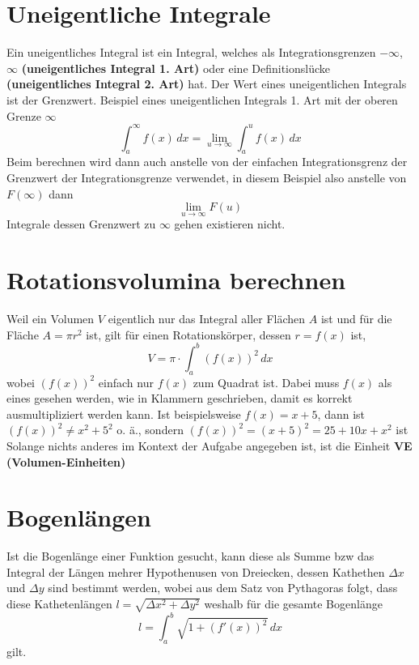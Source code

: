 \documentclass{article}
\begin{document}
\section{Uneigentliche Integrale}
Ein uneigentliches Integral ist ein Integral, welches als Integrationsgrenzen $-\infty$, $\infty$ \textbf{(uneigentliches Integral 1. Art)} oder eine Definitionslücke \textbf{(uneigentliches Integral 2. Art)} hat.
Der Wert eines uneigentlichen Integrals ist der Grenzwert. \newline
Beispiel eines uneigentlichen Integrals 1. Art mit der oberen Grenze $\infty$ 
\[\int_a^\infty f(x)\,dx = \lim_{u \to \infty} \int_a^u f(x)\,dx\] 
Beim berechnen wird dann auch anstelle von der einfachen Integrationsgrenz der Grenzwert der Integrationsgrenze verwendet, in diesem Beispiel also anstelle von $F(\infty)$ dann
\[\lim_{u \to \infty} F(u)\] 
Integrale dessen Grenzwert zu $\infty$ gehen existieren nicht.
 
\section{Rotationsvolumina berechnen}
Weil ein Volumen $V$ eigentlich nur das Integral aller Flächen $A$ ist und für die Fläche $A=\pi r^2$ ist, gilt für einen Rotationskörper, dessen $r=f(x)$ ist,
\[V = \pi \cdot \int_a^b (f(x))^2 \, dx\]
wobei $(f(x))^2$ einfach nur $f(x)$ zum Quadrat ist. Dabei muss $f(x)$ als eines gesehen werden, wie in Klammern geschrieben, damit es korrekt ausmultipliziert werden kann. Ist beispielsweise $f(x)=x+5$, dann ist $(f(x))^2 \neq x^2+5^2$ o. ä., sondern $(f(x))^2=(x+5)^2=25+10x+x^2$ ist \newline
Solange nichts anderes im Kontext der Aufgabe angegeben ist, ist die Einheit \textbf{VE (Volumen-Einheiten)} 
 
\section{Bogenlängen}
Ist die Bogenlänge einer Funktion gesucht, kann diese als Summe bzw das Integral der Längen mehrer Hypothenusen von Dreiecken, dessen Kathethen $\Delta x$ und $\Delta y$ sind bestimmt werden, wobei aus dem Satz von Pythagoras folgt, dass diese Kathetenlängen $l = \sqrt{\Delta x^2 + \Delta y^2}$
weshalb für die gesamte Bogenlänge
\[l = \int_a^b \sqrt{1+(f'(x))^2} \, dx\] 
gilt.
 
\end{document}
